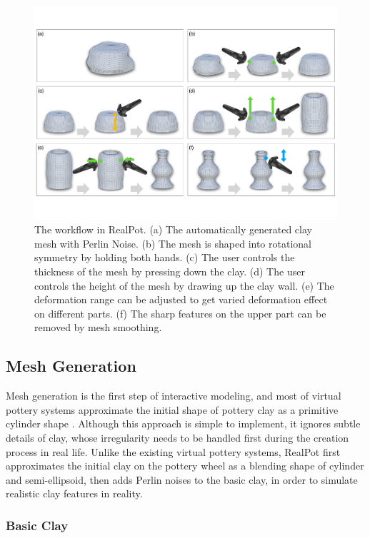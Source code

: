\documentclass{svjour3}                     %
\begin{document}
\begin{figure}
\includegraphics[width=\textwidth]{fig3}
\caption{The workflow in RealPot. (a) The automatically generated clay mesh with Perlin Noise. (b) The mesh is shaped into rotational symmetry by holding both hands. (c) The user controls the thickness of the mesh by pressing down the clay. (d) The user controls the height of the mesh by drawing up the clay wall. (e) The deformation range can be adjusted to get varied deformation effect on different parts. (f) The sharp features on the upper part can be removed by mesh smoothing.}
\label{fig:workflow}
\end{figure}



\subsection{Mesh Generation}
\label{sec:generation}

Mesh generation is the first step of interactive modeling, and most of virtual pottery systems approximate the initial shape of pottery clay as a primitive cylinder shape \cite{han2007ar,ramani2015gesture,ramani2016extracting}.
Although this approach is simple to implement, it ignores subtle details of clay, whose irregularity needs to be handled first during the creation process in real life.
Unlike the existing virtual pottery systems, RealPot first approximates the initial clay on the pottery wheel as a blending shape of cylinder and semi-ellipsoid, then adds Perlin noises to the basic clay, in order to simulate realistic clay features in reality.

\subsubsection{Basic Clay}
\end{document}
